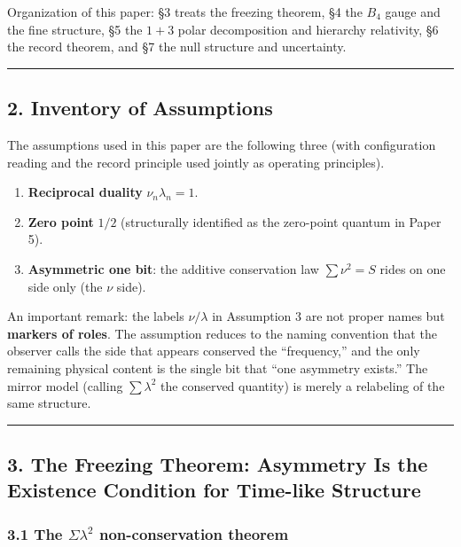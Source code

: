 \documentclass[
]{ltjsarticle}
\providecommand{\tightlist}{%
  \setlength{\itemsep}{0pt}\setlength{\parskip}{0pt}}
\begin{document}
Organization of this paper: §3 treats the freezing theorem, §4 the
\(B_4\) gauge and the fine structure, §5 the \(1{+}3\) polar
decomposition and hierarchy relativity, §6 the record theorem, and §7
the null structure and uncertainty.

\begin{center}\rule{0.5\linewidth}{0.5pt}\end{center}

\subsection{2. Inventory of Assumptions}\label{inventory-of-assumptions}

The assumptions used in this paper are the following three (with
configuration reading and the record principle used jointly as operating
principles).

\begin{enumerate}
\def\labelenumi{\arabic{enumi}.}
\tightlist
\item
  \textbf{Reciprocal duality} \(\nu_n\lambda_n=1\).
\item
  \textbf{Zero point} \(1/2\) (structurally identified as the zero-point
  quantum in Paper 5).
\item
  \textbf{Asymmetric one bit}: the additive conservation law
  \(\sum\nu^2=S\) rides on one side only (the \(\nu\) side).
\end{enumerate}

An important remark: the labels \(\nu/\lambda\) in Assumption 3 are not
proper names but \textbf{markers of roles}. The assumption reduces to
the naming convention that the observer calls the side that appears
conserved the ``frequency,'' and the only remaining physical content is
the single bit that ``one asymmetry exists.'' The mirror model (calling
\(\sum\lambda^2\) the conserved quantity) is merely a relabeling of the
same structure.

\begin{center}\rule{0.5\linewidth}{0.5pt}\end{center}

\subsection{3. The Freezing Theorem: Asymmetry Is the Existence
Condition for Time-like
Structure}\label{the-freezing-theorem-asymmetry-is-the-existence-condition-for-time-like-structure}

\subsubsection{\texorpdfstring{3.1 The \(\Sigma\lambda^2\)
non-conservation
theorem}{3.1 The \textbackslash Sigma\textbackslash lambda\^{}2 non-conservation theorem}}\label{the-sigmalambda2-non-conservation-theorem}
\end{document}
